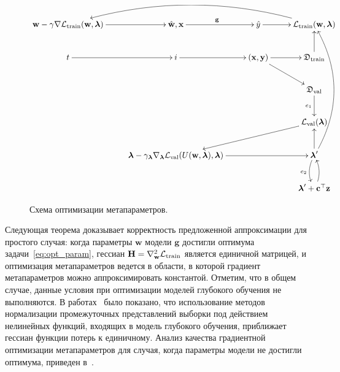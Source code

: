 \documentclass[12pt]{a&t}
\begin{document}
\begin{figure}
$$
\xymatrix{
\mathbf{w} - \gamma\nabla\mathcal{L}_\text{train}(\mathbf{w}, \boldsymbol{\lambda})\ar[r] & \hat{\mathbf{w}}, \mathbf{x}\ar[r]^{\mathbf{g}} & \hat{y}\ar[r] & \mathcal{L}_\text{train}(\mathbf{w}, \boldsymbol{\lambda})\ar@/_2pc/[lll]\\
t\ar[r] & i\ar[r] & (\mathbf{x}, \mathbf{y})\ar[r]\ar[dr] & \mathfrak{D}_\text{train}\ar[u]\\
 &  &  & \mathfrak{D}_\text{val}\ar[d]_{e_1}\\
 &  &  & \mathcal{L}_{\text{val}}(\boldsymbol{\lambda})\ar[dll]\\
 & \boldsymbol{\lambda} - \gamma_{\boldsymbol{\lambda}}\nabla_{\boldsymbol{\lambda}}\mathcal{L}_\text{val}(U(\mathbf{w}, \boldsymbol{\lambda}), \boldsymbol{\lambda})\ar[rr] &  & \boldsymbol{\lambda}^\prime\ar[u]\ar@/_0.5pc/[d]_{e_2}\ar@/_2pc/[uuuu]\\
 &  &  & \boldsymbol{\lambda}^\prime + \mathbf{c}^\top\textbf{z}\ar@/_0.5pc/[u]
}
$$
\caption{Схема оптимизации метапараметров.}
\label{fig:scheme}

\end{figure}






\noindent
Следующая теорема доказывает корректность предложенной аппроксимации для простого случая: когда параметры $\mathbf{w}$ модели $\mathbf{g}$ достигли оптимума задачи~\eqref{eq:opt_param}, гессиан $\mathbf{H} = \nabla_{\mathbf{w}}^2 \mathcal{L}_\textnormal{train}$ является единичной матрицей, и оптимизация метапараметров ведется в области, в которой градиент метапараметров можно аппроксимировать константой. Отметим, что в общем случае, данные условия при оптимизации моделей глубокого обучения не выполняются. В работах~\cite{journals/corr/LuketinaBR15,Vatanen} было показано, что использование методов нормализации промежуточных представлений выборки под действием нелинейных функций, входящих в модель глубокого обучения, приближает гессиан функции потерь к единичному. Анализ качества градиентной оптимизации метапараметров для случая, когда параметры модели не достигли оптимума, приведен в~\cite{journals/corr/Pedregosa16}.
\end{document}
